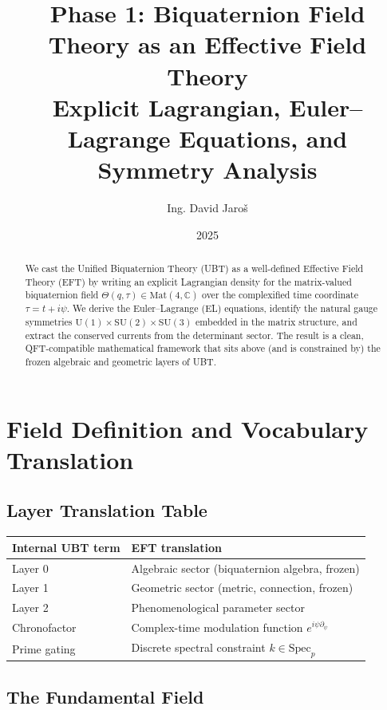\documentclass[12pt]{article}
\title{%
  Phase 1: Biquaternion Field Theory as an Effective Field Theory\\[4pt]
  {\large Explicit Lagrangian, Euler--Lagrange Equations, and Symmetry Analysis}%
}
\author{Ing. David Jaroš}
\date{2025}
\newcommand{\C}{\mathbb{C}}
\begin{document}
\maketitle

\begin{abstract}
We cast the Unified Biquaternion Theory (UBT) as a well-defined Effective Field Theory
(EFT) by writing an explicit Lagrangian density for the matrix-valued biquaternion field
$\Theta(q,\tau)\in\mathrm{Mat}(4,\C)$ over the complexified time coordinate
$\tau=t+i\psi$.
We derive the Euler--Lagrange (EL) equations, identify the natural gauge symmetries
$\mathrm{U}(1)\times\mathrm{SU}(2)\times\mathrm{SU}(3)$ embedded in the matrix
structure, and extract the conserved currents from the determinant sector.
The result is a clean, QFT-compatible mathematical framework that sits above
(and is constrained by) the frozen algebraic and geometric layers of UBT.
\end{abstract}

\tableofcontents

\section{Field Definition and Vocabulary Translation}

\subsection{Layer Translation Table}

\begin{center}
\begin{tabular}{ll}
\hline
\textbf{Internal UBT term} & \textbf{EFT translation}\\
\hline
Layer 0 & Algebraic sector (biquaternion algebra, frozen)\\
Layer 1 & Geometric sector (metric, connection, frozen)\\
Layer 2 & Phenomenological parameter sector\\
Chronofactor & Complex-time modulation function $e^{i\psi\partial_\psi}$\\
Prime gating & Discrete spectral constraint $k\in\mathrm{Spec}_p$\\
\hline
\end{tabular}
\end{center}

\subsection{The Fundamental Field}
\end{document}
